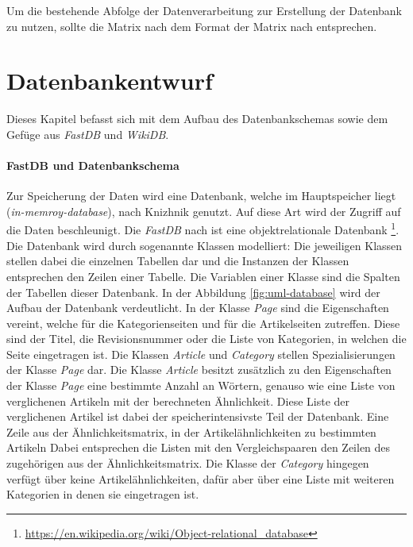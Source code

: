 Um die bestehende Abfolge der Datenverarbeitung zur Erstellung der Datenbank zu nutzen, sollte die Matrix nach \cite{licht:2017} dem Format der Matrix nach \cite{riehmann2016visualizing} entsprechen.




\section{Datenbankentwurf}
\label{subchap:database}
Dieses Kapitel befasst sich mit dem Aufbau des Datenbankschemas sowie dem Gefüge aus \emph{FastDB} und \emph{WikiDB}.

\paragraph{FastDB und Datenbankschema}
Zur Speicherung der Daten wird eine Datenbank, welche im Hauptspeicher liegt (\emph{in-memroy-database}), nach Knizhnik \cite{fastdb} genutzt. Auf diese Art wird der Zugriff auf die Daten beschleunigt.
Die \emph{FastDB} nach \cite{fastdb} ist eine objektrelationale Datenbank \footnote{\url{https://en.wikipedia.org/wiki/Object-relational\_database}}.
Die Datenbank wird durch sogenannte Klassen modelliert: Die jeweiligen Klassen stellen dabei die einzelnen Tabellen dar und die Instanzen der Klassen entsprechen den Zeilen einer Tabelle.
Die Variablen einer Klasse sind die Spalten der Tabellen dieser Datenbank.
In der Abbildung \ref{fig:uml-database} wird der Aufbau der Datenbank verdeutlicht.
In der Klasse \emph{Page} sind die Eigenschaften vereint, welche für die Kategorienseiten und für die Artikelseiten zutreffen.
Diese sind der Titel, die Revisionsnummer oder die Liste von Kategorien, in welchen die Seite eingetragen ist.
Die Klassen \emph{Article} und \emph{Category} stellen Spezialisierungen der Klasse \emph{Page} dar.
Die Klasse \emph{Article} besitzt zusätzlich zu den Eigenschaften der Klasse \emph{Page} eine bestimmte Anzahl an Wörtern, genauso wie eine Liste von verglichenen Artikeln mit der berechneten Ähnlichkeit.
Diese Liste der verglichenen Artikel ist dabei der speicherintensivste Teil der Datenbank.
Eine Zeile aus der Ähnlichkeitsmatrix, in der Artikelähnlichkeiten zu bestimmten Artikeln 
Dabei entsprechen die Listen mit den Vergleichspaaren den Zeilen des zugehörigen aus der Ähnlichkeitsmatrix.
Die Klasse der \emph{Category} hingegen verfügt über keine Artikelähnlichkeiten, dafür aber über eine Liste mit weiteren Kategorien in denen sie eingetragen ist.


